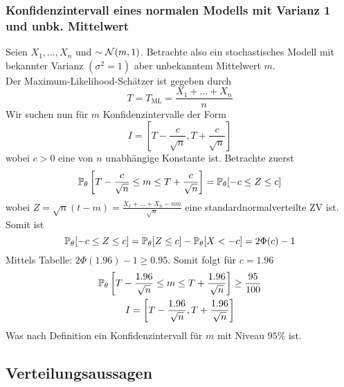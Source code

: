\subsubsection*{Konfidenzintervall eines normalen Modells mit Varianz 1 und unbk. Mittelwert}%
\label{ssub:konfidenzintervall_eines_normalen_modells_mit_varianz_1_und_unbk_mittelwert}

Seien $X_1, \ldots , X_n$ \iid und $\sim \mathcal{N} (m, 1)$. Betrachte also ein stochastisches Modell mit bekannter Varianz
$\left( \sigma^2 = 1 \right)$ aber unbekanntem Mittelwert $m$.\\
Der Maximum-Likelihood-Schätzer ist gegeben durch
\begin{equation*}
	T = T_{\text{ML}} = \frac{X_1 + \ldots + X_n}{n}
\end{equation*}
Wir suchen nun für $m$ Konfidenzintervalle der Form
\begin{equation*}
	I = \left[ T - \frac{c}{\sqrt{n}} , T + \frac{c}{\sqrt{n}} \right]
\end{equation*}
wobei $c > 0$ eine von $n$ unabhängige Konstante ist. Betrachte zuerst
\begin{equation*}
	\mathbb{P}_\theta \left[ T - \frac{c}{\sqrt{n}} \leq m \leq T + \frac{c}{\sqrt{n}} \right] = \mathbb{P}_\theta[ -c \leq Z \leq c ]
\end{equation*}
wobei $Z = \sqrt{n}(t-m) = \frac{X_1 + \ldots + X_n - nm}{\sqrt{n}} $ eine standardnormalverteilte ZV ist. Somit ist
\begin{equation*}
	\mathbb{P}_\theta[ -c \leq Z \leq c ] = \mathbb{P}_\theta [Z \leq c] - \mathbb{P}_\theta [X < -c] = 2 \Phi(c) -1
\end{equation*}
Mittels Tabelle: $2 \Phi (1.96) - 1 \geq 0.95$. Somit folgt für $c = 1.96$
\begin{gather*}
	\mathbb{P}_\theta \left[ T - \frac{1.96}{\sqrt{n}} \leq m \leq T + \frac{1.96}{\sqrt{n}} \right] \geq \frac{95}{100} \\
	I = \left[ T - \frac{1.96}{\sqrt{n}} , T + \frac{1.96}{\sqrt{n}} \right]
\end{gather*}
Was nach Definition ein Konfidenzintervall für $m$ mit Niveau $95 \%$ ist.

\staredssubend


\subsection*{Verteilungsaussagen}%
\label{sub:verteilungsaussagen}

